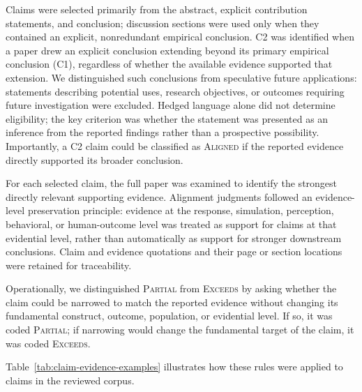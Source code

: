 Claims were selected primarily from the abstract, explicit contribution
statements, and conclusion; discussion sections were used only when they
contained an explicit, nonredundant empirical conclusion. 
C2 was identified when a paper drew an explicit conclusion extending
beyond its primary empirical conclusion (C1), regardless of whether
the available evidence supported that extension. 
We distinguished such conclusions from speculative future applications:
statements describing potential uses, research objectives, or outcomes
requiring future investigation were excluded. 
Hedged language alone did not determine eligibility; the key criterion
was whether the statement was presented as an inference from the
reported findings rather than a prospective possibility. 
Importantly, a C2 claim could be classified as \textsc{Aligned} if
the reported evidence directly supported its broader conclusion.

For each selected claim, the full paper was examined to identify
the strongest directly relevant supporting evidence. 
Alignment judgments followed an evidence-level preservation principle:
evidence at the response, simulation, perception, behavioral, or
human-outcome level was treated as support for claims at that evidential
level, rather than automatically as support for stronger downstream
conclusions. 
Claim and evidence quotations and their page or section locations
were retained for traceability.

Operationally, we distinguished \textsc{Partial} from \textsc{Exceeds}
by asking whether the claim could be narrowed to match the reported
evidence without changing its fundamental construct, outcome, population,
or evidential level. If so, it was coded \textsc{Partial}; if narrowing
would change the fundamental target of the claim, it was coded
\textsc{Exceeds}.

Table~\ref{tab:claim-evidence-examples} illustrates how these rules were
applied to claims in the reviewed corpus.

